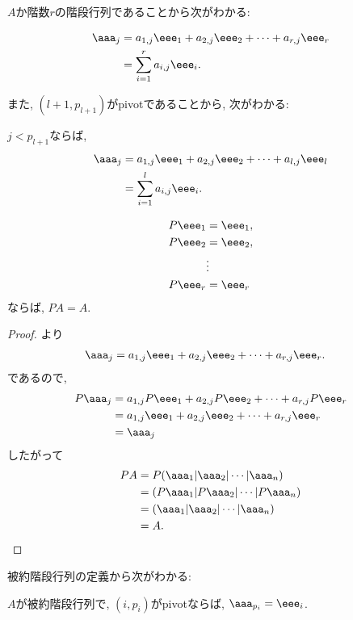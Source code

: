 $A$か階数$r$の階段行列であることから次がわかる:
\begin{lemma}
  \label{lem:3}
  \begin{align*}
    \aaa_{j}&=a_{1,j}\eee_1+a_{2,j}\eee_2+\cdots+a_{r,j}\eee_r\\
    &=\sum_{i=1}^r a_{i,j}\eee_i.
  \end{align*}
\end{lemma}
また, $(l+1,p_{l+1})$がpivotであることから, 次がわかる:
\begin{lemma}
  \label{lem:4}
  $j<p_{l+1}$ならば,
  \begin{align*}
    \aaa_{j}&=a_{1,j}\eee_1+a_{2,j}\eee_2+\cdots+a_{l,j}\eee_l\\
    &=\sum_{i=1}^l a_{i,j}\eee_i.
  \end{align*}
\end{lemma}


\begin{lemma}
  \label{lem:5}
    \begin{align*}
    P\eee_1&=\eee_1,\\
    P\eee_2&=\eee_2,\\
    &\vdots\\
    P\eee_{r}&=\eee_{r}
  \end{align*}
  ならば, $PA=A$.
\end{lemma}
\begin{proof}
  より
  \begin{align*}
    \aaa_{j}&=a_{1,j}\eee_1+a_{2,j}\eee_2+\cdots+a_{r,j}\eee_r.
  \end{align*}
  であるので,
  \begin{align*}
    P\aaa_{j}
    &=a_{1,j}P\eee_1+a_{2,j}P\eee_2+\cdots+a_{r,j}P\eee_r\\
    &=a_{1,j}\eee_1+a_{2,j}\eee_2+\cdots+a_{r,j}\eee_r\\
    &=\aaa_j
  \end{align*}
  したがって
  \begin{align*}
    PA&=P(\aaa_1|\aaa_2|\cdots|\aaa_n)\\
    &=(P\aaa_1|P\aaa_2|\cdots|P\aaa_n)\\
    &=(\aaa_1|\aaa_2|\cdots|\aaa_n)\\
    &=A.
  \end{align*}
\end{proof}

 被約階段行列の定義から次がわかる:
\begin{lemma}
  \label{lem:6}
  $A$が被約階段行列で,
  $(i,p_i)$がpivotならば,
  $\aaa_{p_i}=\eee_i$.
\end{lemma}

